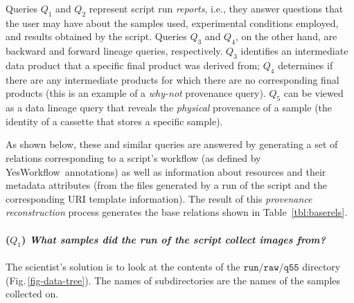 \documentclass[nocopyrightspace]{sigplanconf}
\newcommand{\figref}[1]{Fig.\,\ref{#1}}
\newcommand{\code}[1]{\ensuremath{\mathtt{#1}}}
\newcommand{\YW}{\textsf{YesWorkflow}}
\begin{document}
Queries $Q_1$ and $Q_2$ represent script run \emph{reports}, i.e.,
they answer questions that the user may have about the samples used,
experimental conditions employed, and results obtained by the script.
Queries $Q_3$ and $Q_4$, on the other hand, are backward and forward
lineage queries, respectively. $Q_3$ identifies an intermediate data
product that a specific final product was derived from; $Q_4$
determines if there are any intermediate products for which there are
no corresponding final products (this is an example of a
\emph{why-not} provenance query). $Q_5$ can be viewed as a data
lineage query that reveals the \emph{physical} provenance of a sample
(the identity of a cassette that stores a specific sample).

As shown below, these and similar queries are answered by generating a
set of relations corresponding to a script's workflow (as defined by
\YW\ annotations) as well as information about resources and their
metadata attributes (from the files generated by a run of the script
and the corresponding URI template information). The result of this
\emph{provenance reconstruction} process generates the base relations
shown in Table~\ref{tbl:baserels}.

\paragraph{($Q_1$) \emph{What samples did the run of the script
  collect images from?}} 
The scientist's solution is to look at the contents of the
\code{run/raw/q55} directory (\figref{fig-data-tree}). The names of
subdirectories are the names of the samples collected on.
\end{document}
